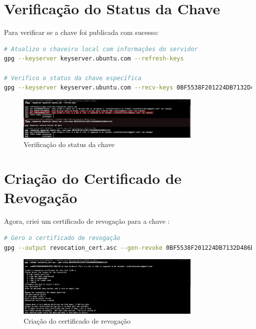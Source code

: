 \section{Verificação do Status da Chave}
Para verificar se a chave foi publicada com sucesso:

\begin{lstlisting}[language=bash]
# Atualizo o chaveiro local com informações do servidor
gpg --keyserver keyserver.ubuntu.com --refresh-keys

# Verifico o status da chave específica
gpg --keyserver keyserver.ubuntu.com --recv-keys 0BF5538F201224DB7132D486DD9A93D9B6812243
\end{lstlisting}

\begin{figure}[!htb]
    \centering
    \includegraphics[width=0.8\textwidth]{images/02-verificacao_status_chave.jpeg}
    \caption{Verificação do status da chave}
    \label{fig:verificacao-status}
\end{figure}

\section{Criação do Certificado de Revogação}
Agora, criei um certificado de revogação para a chave \cite{rfc4880}:

\begin{lstlisting}[language=bash]
# Gero o certificado de revogação
gpg --output revocation_cert.asc --gen-revoke 0BF5538F201224DB7132D486DD9A93D9B6812243
\end{lstlisting}

\begin{figure}[!htb]
    \centering
    \includegraphics[width=0.8\textwidth]{images/02-criacao_certificado_revogacao.jpg}
    \caption{Criação do certificado de revogação}
    \label{fig:criacao-cert-revogacao}
\end{figure}

